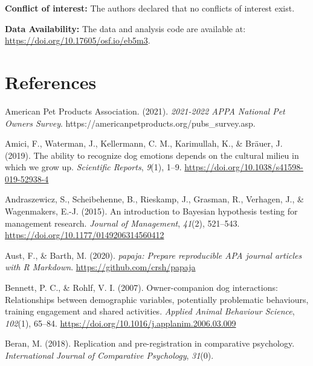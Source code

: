 \documentclass[
  pub,floatsintext]{apa6}
\newlength{\cslhangindent}
\newlength{\cslentryspacingunit} %
\newenvironment{CSLReferences}[2] %
 {%
  \setlength{\parindent}{0pt}
  \ifodd #1
  \let\oldpar\par
  \def\par{\hangindent=\cslhangindent\oldpar}
  \fi
  \setlength{\parskip}{#2\cslentryspacingunit}
 }%
 {}
\begin{document}
\textbf{Conflict of interest:} The authors declared that no conflicts of interest exist.

\textbf{Data Availability:} The data and analysis code are available at: \url{https://doi.org/10.17605/osf.io/eb5m3}.

\hypertarget{references}{%
\section{References}\label{references}}

\scriptsize

\begingroup

\hypertarget{refs}{}
\begin{CSLReferences}{1}{0}
\leavevmode{}%
American Pet Products Association. (2021). \emph{2021-2022 {APPA National Pet Owners Survey}}. https://americanpetproducts.org/pubs\_survey.asp.

\leavevmode{}%
Amici, F., Waterman, J., Kellermann, C. M., Karimullah, K., \& Bräuer, J. (2019). The ability to recognize dog emotions depends on the cultural milieu in which we grow up. \emph{Scientific Reports}, \emph{9}(1), 1--9. \url{https://doi.org/10.1038/s41598-019-52938-4}

\leavevmode{}%
Andraszewicz, S., Scheibehenne, B., Rieskamp, J., Grasman, R., Verhagen, J., \& Wagenmakers, E.-J. (2015). An introduction to {Bayesian} hypothesis testing for management research. \emph{Journal of Management}, \emph{41}(2), 521--543. \url{https://doi.org/10.1177/0149206314560412}

\leavevmode{}%
Aust, F., \& Barth, M. (2020). \emph{{papaja}: {Prepare} reproducible {APA} journal articles with {R Markdown}}. \url{https://github.com/crsh/papaja}

\leavevmode{}%
Bennett, P. C., \& Rohlf, V. I. (2007). Owner-companion dog interactions: {Relationships} between demographic variables, potentially problematic behaviours, training engagement and shared activities. \emph{Applied Animal Behaviour Science}, \emph{102}(1), 65--84. \url{https://doi.org/10.1016/j.applanim.2006.03.009}

\leavevmode{}%
Beran, M. (2018). Replication and pre-registration in comparative psychology. \emph{International Journal of Comparative Psychology}, \emph{31}(0).


\end{CSLReferences}
\end{document}

